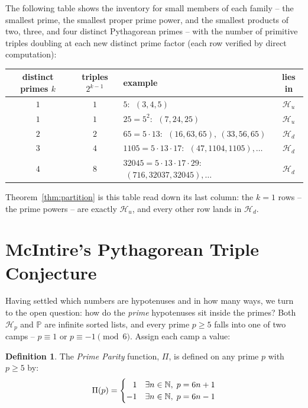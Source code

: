 \documentclass{article}
\theoremstyle{plain}
\theoremstyle{definition}
\newtheorem{defn}{Definition}
\theoremstyle{remark}
\begin{document}
The following table shows the inventory for small members of each
family -- the smallest prime, the smallest proper prime power, and the
smallest products of two, three, and four distinct Pythagorean primes --
with the number of primitive triples doubling at each new distinct
prime factor (each row verified by direct computation):
\begin{center}
\begin{tabular}{c|c|l|c}
 distinct primes $k$ & triples $2^{k-1}$ & example & lies in \\
\hline
 $1$ & $1$ & $5$: $\;(3,4,5)$ & $\mathcal{H}_u$ \\
 $1$ & $1$ & $25 = 5^2$: $\;(7,24,25)$ & $\mathcal{H}_u$ \\
 $2$ & $2$ & $65 = 5 \cdot 13$: $\;(16,63,65),\ (33,56,65)$ & $\mathcal{H}_d$ \\
 $3$ & $4$ & $1105 = 5 \cdot 13 \cdot 17$: $\;(47,1104,1105), \ldots$ & $\mathcal{H}_d$ \\
 $4$ & $8$ & $32045 = 5 \cdot 13 \cdot 17 \cdot 29$: $\;(716,32037,32045), \ldots$ & $\mathcal{H}_d$ \\
\end{tabular}
\end{center}
Theorem~\ref{thm:partition} is this table read down its last column: the
$k = 1$ rows -- the prime powers -- are exactly $\mathcal{H}_u$, and every
other row lands in $\mathcal{H}_d$.

\newpage
\section{McIntire's Pythagorean Triple Conjecture}

Having settled which numbers are hypotenuses and in how many ways, we turn
to the open question: how do the {\em prime\/} hypotenuses sit inside the
primes? Both $\mathcal{H}_p$ and $\mathbb{P}$ are infinite sorted lists,
and every prime $p \ge 5$ falls into one of two camps -- $p \equiv 1$ or
$p \equiv -1 \pmod 6$. Assign each camp a value:

\begin{defn}
The {\em Prime Parity\/} function, $\Pi$, is defined on any prime $p$ with $p \ge 5$ by:
\begin{equation}
  \Pi(p) = \begin{cases}
  \hphantom{-}1 & \exists n \in \mathbb{N}, \; p = 6n + 1 \\
            -1  & \exists n \in \mathbb{N}, \; p = 6n - 1
             \end{cases}
\end{equation}
\end{defn}
\end{document}
